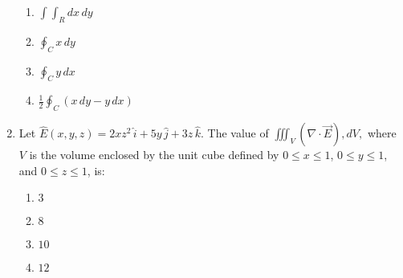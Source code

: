 \documentclass[journal,12pt,onecolumn]{IEEEtran}
\theoremstyle{remark}
\begin{document}
\begin{enumerate}
\begin{figure}[!ht]
\label{fig:my_label}
\end{figure}
\begin{enumerate}
    \item $\int\!\!\!\int_R dx \, dy$
    \item $\oint_C x \, dy$
    \item $\oint_C y \, dx$
    \item $\frac{1}{2} \oint_C (x \, dy - y \, dx)$
\end{enumerate}

\item  Let $\hat{E}(x, y, z) = 2x z^2 \, \hat{i} + 5y \, \hat{j} + 3z \, \hat{k}$. The value of 
$\iiint_V (\nabla \cdot \overrightarrow{E}) , dV,$
where $V$ is the volume enclosed by the unit cube defined by $0 \leq x \leq 1$, $0 \leq y \leq 1$, and $0 \leq z \leq 1$, is:
\begin{enumerate}
    \item $3$
    \item $8$
    \item $10$
    \item $12$
\end{enumerate}

    


\end{enumerate}
\end{document}
